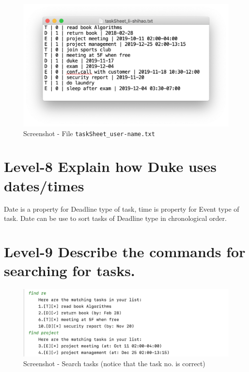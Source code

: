 \documentclass[a4paper,11pt, twoside]{article}
\begin{document}
\begin{table} [htbp]
\begin{figure}[H]
\centering
\includegraphics[width = 13.8cm]{file.png}
\caption{Screenshot - File \texttt{taskSheet\_user-name.txt}} 
\end{figure} 

\section* {Level-8 Explain how Duke uses dates/times} 
Date is a property for Deadline type of task, time is property for Event type of task. 
Date can be use to sort tasks of Deadline type in chronological order.  

\section* {Level-9 Describe the commands for searching for tasks.} 
\begin{figure}[H]
\centering
\includegraphics[width = 15.4cm]{find.png}
\caption{Screenshot - Search tasks (notice that the task no. is correct)} 
\end{figure} 



\end{table}
\end{document}
